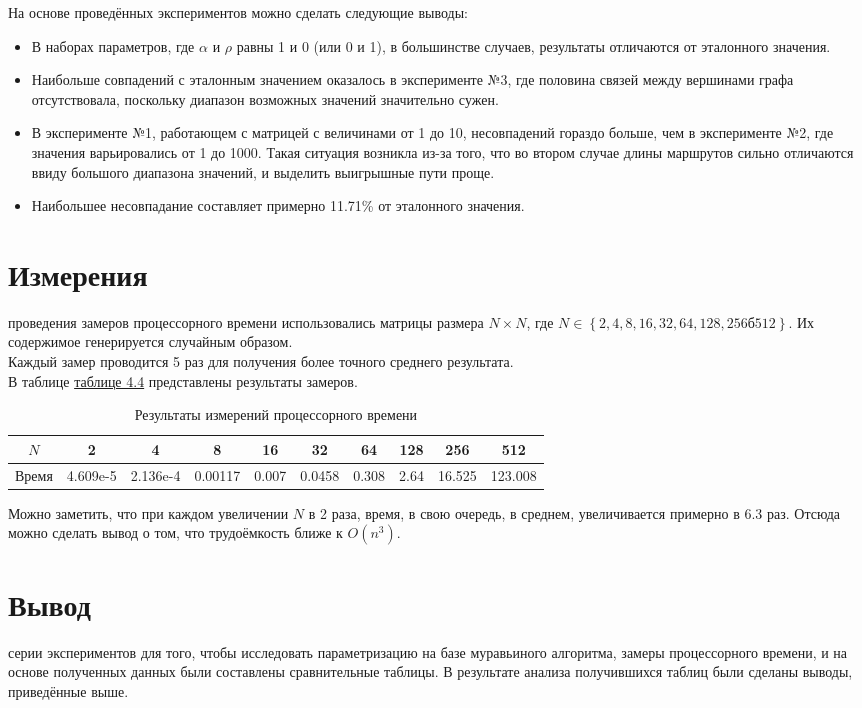 На основе проведённых экспериментов можно сделать следующие выводы:
\begin{itemize}
	\item В наборах параметров, где $\alpha$ и $\rho$ равны 1 и 0 (или 0 и 1), в большинстве случаев, результаты отличаются от эталонного значения.
	\item Наибольше совпадений с эталонным значением оказалось в эксперименте №3, где половина связей между вершинами графа отсутствовала, поскольку диапазон возможных значений значительно сужен.
	\item В эксперименте №1, работающем с матрицей с величинами от 1 до 10, несовпадений гораздо больше, чем в эксперименте №2, где значения варьировались от 1 до 1000. Такая ситуация возникла из-за того, что во втором случае длины маршрутов сильно отличаются ввиду большого диапазона значений, и выделить выигрышные пути проще.
	\item Наибольшее несовпадание составляет примерно 11.71\% от эталонного значения.
\end{itemize}

\section{Измерения}
 проведения замеров процессорного времени использовались матрицы размера $N \times N$, где $N \in \left\lbrace 2, 4, 8, 16, 32, 64, 128, 256б 512 \right\rbrace$.
Их содержимое генерируется случайным образом.\\ 

Каждый замер проводится 5 раз для получения более точного среднего результата. \\

В таблице \hyperref[table_time]{таблице 4.4} представлены результаты замеров.

\begin{table}[ph] \label{table_time}
	\caption{Результаты измерений процессорного времени}
	\centering
	\begin{tabular}{|c|c|c|c|c|c|c|c|c|c|}
		\hline
		$N$ &2 &4 &8 &16 &32 &64 &128 &256 &512\\
		\hline
		Время    &4.609e-5 &2.136e-4 &0.00117 &0.007 &0.0458 &0.308 &2.64 &16.525 &123.008\\
		\hline
	\end{tabular}
\end{table}

Можно заметить, что при каждом увеличении $N$ в 2 раза, время, в свою очередь, в среднем, увеличивается примерно в 6.3 раз. Отсюда можно сделать вывод о том, что трудоёмкость ближе к $O(n^3)$.

\section*{Вывод}
 серии экспериментов для того, чтобы исследовать параметризацию на базе муравьиного алгоритма, замеры процессорного времени, и на основе полученных данных были составлены сравнительные таблицы. В результате анализа получившихся таблиц были сделаны выводы, приведённые выше.
